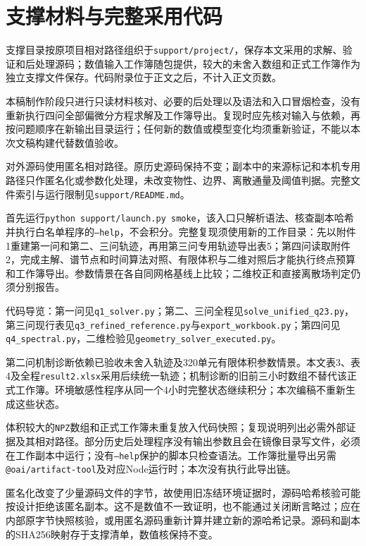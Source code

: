 \section{支撑材料与完整采用代码}
\label{sec:complete-code}
支撑目录按原项目相对路径组织于\texttt{support/project/}，保存本文采用的求解、验证和后处理源码；数值输入工作簿随包提供，较大的未舍入数组和正式工作簿作为独立支撑文件保存。代码附录位于正文之后，不计入正文页数。

本稿制作阶段只进行只读材料核对、必要的后处理以及语法和入口冒烟检查，没有重新执行四问全部偏微分方程求解及工作簿导出。复现时应先核对输入与依赖，再按问题顺序在新输出目录运行；任何新的数值或模型变化均须重新验证，不能以本次文稿构建代替数值验收。

对外源码使用匿名相对路径。原历史源码保持不变；副本中的来源标记和本机专用路径只作匿名化或参数化处理，未改变物性、边界、离散通量及阈值判据。完整文件索引与运行限制见\texttt{support/README.md}。

首先运行\texttt{python support/launch.py smoke}，该入口只解析语法、核查副本哈希并执行白名单程序的\texttt{--help}，不会积分。完整复现须使用新的工作目录：先以附件1重建第一问和第二、三问轨迹，再用第三问专用轨迹导出表5；第四问读取附件2，完成主解、谱节点和时间算法对照、有限体积与二维对照后才能执行终点预算和工作簿导出。参数情景在各自同网格基线上比较；二维校正和直接离散场判定仍须分别报告。

代码导览：第一问见\nolinkurl{q1_solver.py}；第二、三问全程见\nolinkurl{solve_unified_q23.py}，第三问现行表见\nolinkurl{q3_refined_reference.py}与\nolinkurl{export_workbook.py}；第四问见\nolinkurl{q4_spectral.py}，二维检验见\nolinkurl{geometry_solver_executed.py}。

第二问机制诊断依赖已验收未舍入轨迹及320单元有限体积参数情景。本文表3、表4及全程\texttt{result2.xlsx}采用后续统一轨迹；机制诊断的旧前三小时数组不替代该正式工作簿。环境敏感性程序从同一个4小时完整状态继续积分；本次编稿不重新生成这些状态。

体积较大的\texttt{NPZ}数组和正式工作簿未重复放入代码快照；复现说明列出必需外部证据及其相对路径。部分历史后处理程序没有输出参数且会在镜像目录写文件，必须在工作副本中运行；没有\texttt{--help}保护的脚本只检查语法。工作簿批量导出另需\texttt{@oai/artifact-tool}及对应Node运行时；本次没有执行此导出链。

匿名化改变了少量源码文件的字节，故使用旧冻结环境证据时，源码哈希核验可能按设计拒绝该匿名副本。这不是数值不一致证明，也不能通过关闭断言略过；应在内部原字节快照核验，或用匿名源码重新计算并建立新的源哈希记录。源码和副本的SHA256映射存于支撑清单，数值核保持不变。

